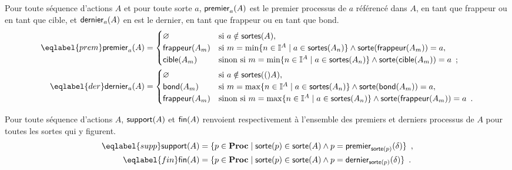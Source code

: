 \begin{definition}
  Pour toute séquence d'actions $A$ et pour toute sorte $a$,
  $\mathsf{premier}_{a}(A)$ est le premier processus de $a$ référencé dans $A$,
  en tant que frappeur ou en tant que cible,
  et $\mathsf{dernier}_{a}(A)$ en est le dernier,
  en tant que frappeur ou en tant que bond.
  \begin{align}
  \eqlabel{prem}
    \prem{a}{A} &=
      \begin{cases}
        \varnothing & \text{si } a \notin \sortes{A}, \\
        \hitter{A_m} & \text{si } m = \min\{ n \in \indexes{A} \mid a \in \sortes{A_n} \}
          \wedge \sorte{\hitter{A_m}} = a, \\
        \target{A_m} & \text{sinon si } m = \min\{ n \in \indexes{A} \mid a \in \sortes{A_n} \}
          \wedge \sorte{\target{A_m}} = a \enspace;
      \end{cases} \\
  \eqlabel{der}
    \der{a}{A} &=
      \begin{cases}
        \varnothing & \text{si } a \notin \sorts(A), \\
        \bounce{A_m} & \text{si } m = \max\{ n \in \indexes{A} \mid a \in \sortes{A_n} \}
          \wedge \sorte{\bounce{A_m}} = a, \\
        \hitter{A_m} & \text{sinon si } m = \max\{ n \in \indexes{A} \mid a \in \sortes{A_n} \}
          \wedge \sorte{\hitter{A_m}} = a \enspace.
      \end{cases}
  \end{align}

  Pour toute séquence d'actions $A$,
  $\mathsf{support}(A)$ et $\mathsf{fin}(A)$ renvoient respectivement à l'ensemble des premiers
  et derniers processus de $A$ pour toutes les sortes qui y figurent.
  \begin{align}
  \eqlabel{supp}
    \supp{A} &= \{ p \in \Proc \mid \sorte{p} \in \sorte{A} \wedge
      p = \prem{\sort{p}}{\delta} \} \enspace, \\
  \eqlabel{fin}
    \fin{A} &= \{ p \in \Proc \mid \sorte{p} \in \sorte{A} \wedge
      p = \der{\sort{p}}{\delta} \} \enspace.
  \end{align}
\end{definition}

